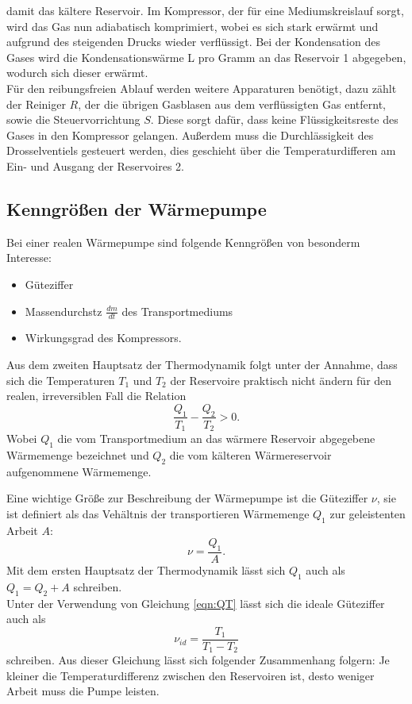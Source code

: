 damit das kältere Reservoir. Im Kompressor, der für eine Mediumskreislauf sorgt, wird das Gas nun
adiabatisch komprimiert, wobei es sich stark erwärmt und aufgrund des steigenden Drucks wieder verflüssigt.
Bei der Kondensation des Gases wird die Kondensationswärme L pro Gramm an das Reservoir 1 abgegeben, wodurch sich
dieser erwärmt.\\
Für den reibungsfreien Ablauf werden weitere Apparaturen benötigt, dazu zählt der Reiniger $R$, der
die übrigen Gasblasen aus dem verflüssigten Gas entfernt, sowie die Steuervorrichtung $S$.
Diese sorgt dafür, dass keine Flüssigkeitsreste des Gases in den Kompressor gelangen.
Außerdem muss die Durchlässigkeit des Drosselventiels gesteuert werden, dies geschieht über
die Temperaturdifferen am Ein- und Ausgang der Reservoires 2.

\subsection{Kenngrößen der Wärmepumpe}
Bei einer realen Wärmepumpe sind folgende Kenngrößen von besonderm Interesse:
\begin{itemize}
  \item Güteziffer
  \item Massendurchstz $\frac{dm}{dt}$ des Transportmediums
  \item Wirkungsgrad des Kompressors.
\end{itemize}

Aus dem zweiten Hauptsatz der Thermodynamik folgt unter der Annahme, dass sich die Temperaturen
$T_{1}$ und $T_{2}$ der Reservoire praktisch nicht ändern für den realen, irreversiblen Fall die Relation
\begin{equation}
  \frac{Q_{1}}{T_{1}}-\frac{Q_{2}}{T_{2}}>0.
  \label{eqn:QT}
\end{equation}
Wobei $Q_{1}$ die vom Transportmedium an das wärmere Reservoir abgegebene Wärmemenge bezeichnet und
$Q_{2}$ die vom kälteren Wärmereservoir aufgenommene Wärmemenge.

Eine wichtige Größe zur Beschreibung der Wärmepumpe ist die Güteziffer $\nu$, sie ist definiert
als das Vehältnis der transportieren Wärmemenge $Q_{1}$ zur geleistenten Arbeit $A$:
\begin{equation}
  \nu=\frac{Q_{1}}{A}.
  \label{eqn:güte}
\end{equation}
Mit dem ersten Hauptsatz der Thermodynamik lässt sich $Q_{1}$ auch als $Q_{1}=Q_{2}+A$ schreiben.\\
Unter der Verwendung von Gleichung \ref{eqn:QT} lässt sich die ideale Güteziffer auch als
\begin{equation}
  \nu_{id}=\frac{T_{1}}{T_{1}-T_{2}}
  \label{eqn:güte2}
\end{equation}
schreiben. Aus dieser Gleichung lässt sich folgender Zusammenhang folgern:
Je kleiner die Temperaturdifferenz zwischen den Reservoiren ist, desto weniger Arbeit muss
die Pumpe leisten.

